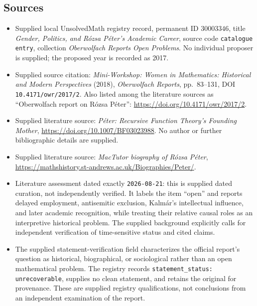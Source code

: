 \documentclass[11pt]{article}
\begin{document}
\subsection{Sources}
\begin{itemize}
\item Supplied local UnsolvedMath registry record, permanent ID \(30003346\), title \emph{Gender, Politics, and Rózsa Péter's Academic Career}, source code \texttt{catalogue entry}, collection \emph{Oberwolfach Reports Open Problems}. No individual proposer is supplied; the proposed year is recorded as 2017.
\item Supplied source citation: \emph{Mini-Workshop: Women in Mathematics: Historical and Modern Perspectives} (2018), \emph{Oberwolfach Reports}, pp.\ 83--131, DOI \texttt{10.4171/owr/2017/2}. Also listed among the literature sources as ``Oberwolfach report on Rózsa Péter'': \url{https://doi.org/10.4171/owr/2017/2}.
\item Supplied literature source: \emph{Péter: Recursive Function Theory's Founding Mother}, \url{https://doi.org/10.1007/BF03023988}. No author or further bibliographic details are supplied.
\item Supplied literature source: \emph{MacTutor biography of Rózsa Péter}, \url{https://mathshistory.st-andrews.ac.uk/Biographies/Peter/}.
\item Literature assessment dated exactly \texttt{2026-08-21}: this is supplied dated curation, not independently verified. It labels the item ``open'' and reports delayed employment, antisemitic exclusion, Kalmár's intellectual influence, and later academic recognition, while treating their relative causal roles as an interpretive historical problem. The supplied background explicitly calls for independent verification of time-sensitive status and cited claims.
\item The supplied statement-verification field characterizes the official report's question as historical, biographical, or sociological rather than an open mathematical problem. The registry records \texttt{statement\_status: unrecoverable}, supplies no clean statement, and retains the original for provenance. These are supplied registry qualifications, not conclusions from an independent examination of the report.
\end{itemize}
\end{document}
